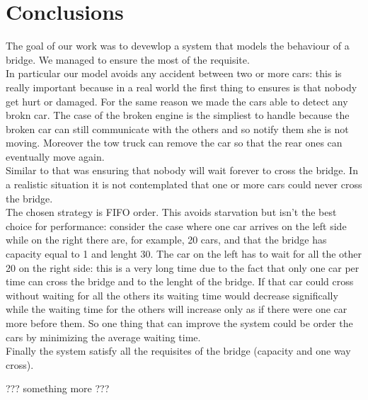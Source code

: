 \chapter{Conclusions}\label{ch:conclusions}

The goal of our work was to devewlop a system that models the behaviour of a bridge. We managed to ensure
the most of the requisite.\\ In particular our model avoids any accident between two or more cars: this is 
really important because in a real world the first thing to ensures is that nobody get hurt or damaged. 
For the same reason we made the cars able to detect any brokn car. The case of the broken engine is the simpliest
to handle because the broken car can still communicate with the others and so notify them she is not moving.
Moreover the tow truck can remove the car so that the rear ones can eventually move again.\\ Similar to that
was ensuring that nobody will wait forever to cross the bridge. In a realistic situation it is not contemplated
that one or more cars could never cross the bridge.\\
The chosen strategy is FIFO order. This avoids starvation but isn't the best choice for performance: consider
the case where one car arrives on the left side while on the right there are, for example, 20 cars, and that the bridge
has capacity equal to 1 and lenght 30. The car on the left has to wait for all the other 20 on the right side: this 
is a very long time due to the fact that only one car per time can cross the bridge and to the lenght of the bridge.
If that car could cross without waiting for all the others its waiting time would decrease significally while
the waiting time for the others will increase only as if there were one car more before them. So one thing 
that can improve the system could be order the cars by minimizing the average waiting time.\\
Finally the system satisfy all the requisites of the bridge (capacity and one way cross).

??? something more  ???
